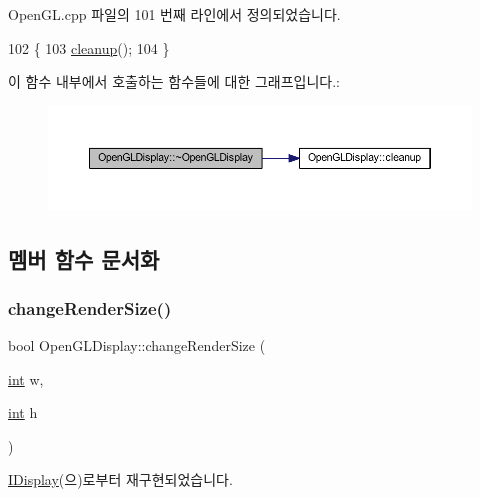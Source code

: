 Open\+G\+L.\+cpp 파일의 101 번째 라인에서 정의되었습니다.


\begin{DoxyCode}
102 \{
103     \mbox{\hyperlink{class_open_g_l_display_a870bdc3cf12a50ff23755e1869f9026e}{cleanup}}();
104 \}
\end{DoxyCode}
이 함수 내부에서 호출하는 함수들에 대한 그래프입니다.\+:
\nopagebreak
\begin{figure}[H]
\begin{center}
\leavevmode
\includegraphics[width=350pt]{class_open_g_l_display_ac628237ab5084bd4f74178b69fb51088_cgraph}
\end{center}
\end{figure}


\subsection{멤버 함수 문서화}
\mbox{\label{class_open_g_l_display_aa0dc96c6070cadf3eb6e52875a72b449}} 
\subsubsection{\texorpdfstring{change\+Render\+Size()}{changeRenderSize()}}
{\footnotesize\ttfamily bool Open\+G\+L\+Display\+::change\+Render\+Size (\begin{DoxyParamCaption}\item[{\mbox{\hyperlink{_util_8cpp_a0ef32aa8672df19503a49fab2d0c8071}{int}}}]{w,  }\item[{\mbox{\hyperlink{_util_8cpp_a0ef32aa8672df19503a49fab2d0c8071}{int}}}]{h }\end{DoxyParamCaption})\hspace{0.3cm}{\ttfamily [virtual]}}



\mbox{\hyperlink{class_i_display_ab6e4355da026afb85710ae3e12329176}{I\+Display}}(으)로부터 재구현되었습니다.




